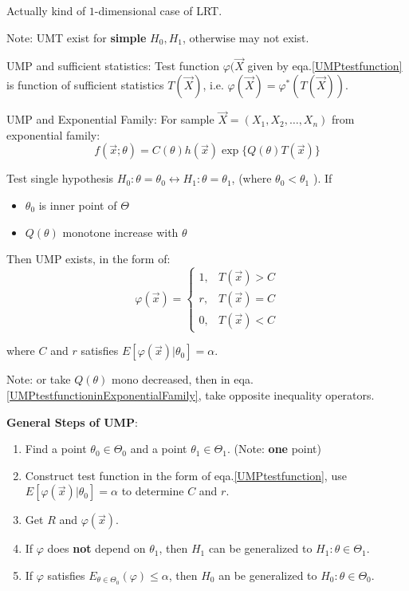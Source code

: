     Actually kind of $1$-dimensional case of LRT.

    Note: UMT exist for\textbf{ simple }$H_0,H_1$, otherwise may not exist.

    UMP and sufficient statistics: Test function $\varphi(\vec{X}$ given by eqa.\ref{UMPtestfunction} is function of sufficient statistics $T(\vec{X})$, i.e. $\varphi(\vec{X})=\varphi^*(T(\vec{X}))$.

    UMP and Exponential Family: For sample $\vec{X}=(X_1,X_2,\dots,X_n)$ from exponential family:
    \[
    f(\vec{x};\theta)=C(\theta)h(\vec{x})\exp\{Q(\theta)T(\vec{x})\}    
    \]

    Test single hypothesis $H_0:\theta=\theta_0\longleftrightarrow H_1:\theta=\theta_1$, (where $ \theta_0<\theta_1 $ ).
    If 
    \begin{itemize}[topsep=0.5pt,itemsep=0pt]
        \item $\theta_0$ is inner point of $\Theta$
        \item $Q(\theta)$  monotone increase with $\theta$
    \end{itemize}

    Then UMP exists, in the form of:
    \begin{equation}\label{UMPtestfunctioninExponentialFamily}
            \varphi(\vec{x})=\begin{cases}
        1,&T(\vec{x})>C\\
        r,&T(\vec{x})=C\\
        0,&T(\vec{x})<C
    \end{cases} 
    \end{equation}
   
    

    where $C$ and $r$ satisfies $E[\varphi(\vec{x})|\theta_0]=\alpha$.

    Note: or take $Q(\theta)$ mono decreased, then in eqa.\ref{UMPtestfunctioninExponentialFamily}, take opposite inequality operators.
    
\begin{point}
    \textbf{General Steps of UMP}:
\end{point}

    
    \begin{enumerate}
        \item Find a point $\theta_0\in\Theta_0$ and a point $\theta_1\in\Theta_1$. (Note: \textbf{one} point)
        \item Construct test function in the form of eqa.\hyperref[UMPtestfunction]{\ref{UMPtestfunction}}, use $E[\varphi(\vec{x})|\theta_0]=\alpha$ to determine $C$ and $r$.
        \item Get $R$ and $\varphi(\vec{x})$.
        \item If $\varphi$ does \textbf{not} depend on $\theta_1$, then $H_1$ can be generalized to $H_1:\theta\in\Theta_1$.
        \item If $\varphi$ satisfies $E_{\theta\in\Theta_0}(\varphi)\leq\alpha$, then $H_0$ an be generalized to $H_0:\theta\in\Theta_0$.
    \end{enumerate}

